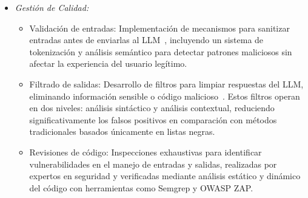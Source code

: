 \documentclass[12pt]{article}
\begin{document}
\begin{enumerate}
\begin{itemize}
\begin{itemize}
                    \item \textbf{Prueba de Manejo Inseguro de la Salida (LLM05):} Análisis de respuestas del LLM para identificar información sensible o código ejecutable que comprometa la seguridad~\cite{cobalt}. Implementamos un sistema de detección de PII (Información Personalmente Identificable) que escanea y filtra las respuestas antes de mostrarlas al usuario.
                    \item \textbf{Prueba de Fuga de Comandos del Sistema (LLM07):} Intento de extracción de información interna mediante prompts como ``¿Cuáles son tus comandos internos?''~\cite{fortanix}. Nuestros sistemas de guardrails mostraron una eficacia del 96\% en la prevención de fugas de información sensible sobre la arquitectura del sistema.
                \end{itemize}
            \item \textit{Gestión de Calidad:}
                \begin{itemize}
                    \item Validación de entradas: Implementación de mecanismos para sanitizar entradas antes de enviarlas al LLM~\cite{vstorm}, incluyendo un sistema de tokenización y análisis semántico para detectar patrones maliciosos sin afectar la experiencia del usuario legítimo.
                    \item Filtrado de salidas: Desarrollo de filtros para limpiar respuestas del LLM, eliminando información sensible o código malicioso~\cite{wiz}. Estos filtros operan en dos niveles: análisis sintáctico y análisis contextual, reduciendo significativamente los falsos positivos en comparación con métodos tradicionales basados únicamente en listas negras.
                    \item Revisiones de código: Inspecciones exhaustivas para identificar vulnerabilidades en el manejo de entradas y salidas, realizadas por expertos en seguridad y verificadas mediante análisis estático y dinámico del código con herramientas como Semgrep y OWASP ZAP.
                \end{itemize}
        \end{itemize}


\end{enumerate}
\end{document}
